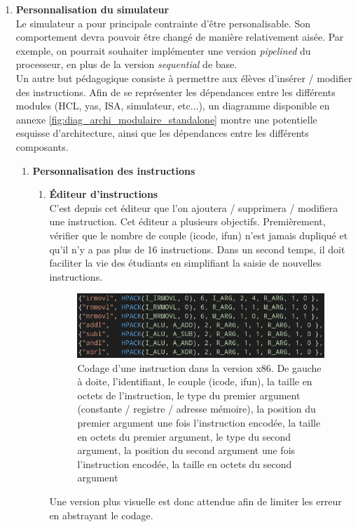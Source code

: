 \documentclass[french]{article}
\newcommand{\itembf}[1]{\item \textbf{#1}\\}
\begin{document}
\begin{enumerate}
    \itembf{Personnalisation du simulateur}
    \label{personnalisation_simulateur}
    Le simulateur a pour principale contrainte d'être personalisable. Son comportement devra pouvoir être changé de manière relativement aisée. Par exemple, on pourrait souhaiter implémenter une version \textit{pipelined} du processeur, en plus de la version \textit{sequential} de base.\\
    Un autre but pédagogique consiste à permettre aux élèves d'insérer / modifier des instructions. 
    Afin de se représenter les dépendances entre les différents modules (HCL, yas, ISA, simulateur, etc...), un diagramme disponible en annexe \ref{fig:diag_archi_modulaire_standalone} montre une potentielle esquisse d'architecture, ainsi que les dépendances entre les différents composants.
    
    \begin{enumerate}
        \itembf{Personnalisation des instructions}
        \begin{enumerate}
            \itembf{Éditeur d'instructions}
            C'est depuis cet éditeur que l'on ajoutera / supprimera / modifiera une instruction. Cet éditeur a plusieurs objectifs. Premièrement, vérifier que le nombre de couple (icode, ifun) n'est jamais dupliqué et qu'il n'y a pas plus de 16 instructions. Dans un second temps, il doit faciliter la vie des étudiants en simplifiant la saisie de nouvelles instructions.
            \begin{figure}[H]
                \centering
                \includegraphics{img/ex_ancien_is.png}
                \caption{Codage d'une instruction dans la version x86. De gauche à doite, l'identifiant, le couple (icode, ifun), la taille en octets de l'instruction, le type du premier argument (constante / registre / adresse mémoire), la position du premier argument une fois l'instruction encodée, la taille en octets du premier argument, le type du second argument, la position du second argument une fois l'instruction encodée, la taille en octets du second argument}
                \label{fig:ex_ancien_is}
            \end{figure}
            Une version plus visuelle est donc attendue afin de limiter les erreur en abstrayant le codage.
            

\end{enumerate}
\end{enumerate}
\end{enumerate}
\end{document}

